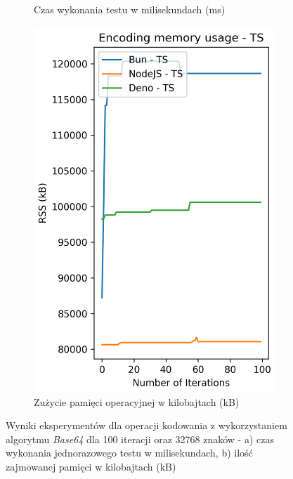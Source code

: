 \begin{figure}[H]
\begin{subfigure}[b]{0.44\textwidth}
    \caption{Czas wykonania testu w milisekundach (ms)}
    \label{fig:encoding_e1_ts_time}
  \end{subfigure}
  \begin{subfigure}[b]{0.44\textwidth}
    \centering
    \includegraphics[width=\textwidth]{Figures/coding/base64_100_encoding_ts_memory.png}
    \caption{Zużycie pamięci operacyjnej w kilobajtach (kB)}
    \label{fig:encoding_e1_ts_memory}
  \end{subfigure}
  \hfill
  \caption{Wyniki eksperymentów dla operacji kodowania z wykorzystaniem algorytmu \textit{Base64} dla 100 iteracji oraz 32768 znaków - a) czas wykonania jednorazowego testu w milisekundach, b) ilość zajmowanej pamięci w kilobajtach (kB)}
  \label{fig:encoding_e1_ts}
\end{figure}

